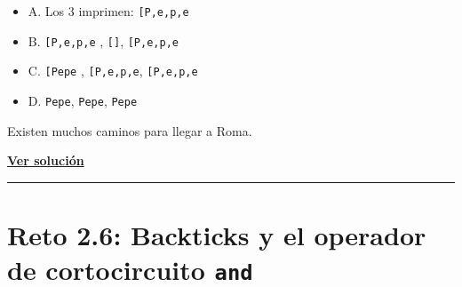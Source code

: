 \documentclass[
  letterpaper,
  DIV=11,
  numbers=noendperiod]{scrreprt}
\providecommand{\tightlist}{%
  \setlength{\itemsep}{0pt}\setlength{\parskip}{0pt}}
\begin{document}
\begin{itemize}
\tightlist
\item
  A. Los 3 imprimen:
  \texttt{{[}\textquotesingle{}P\textquotesingle{},\textquotesingle{}e\textquotesingle{},\textquotesingle{}p\textquotesingle{},\textquotesingle{}e\textquotesingle{}{]}}
\item
  B.
  \texttt{{[}\textquotesingle{}P\textquotesingle{},\textquotesingle{}e\textquotesingle{},\textquotesingle{}p\textquotesingle{},\textquotesingle{}e\textquotesingle{}{]}}
  , \texttt{{[}{]}},
  \texttt{{[}\textquotesingle{}P\textquotesingle{},\textquotesingle{}e\textquotesingle{},\textquotesingle{}p\textquotesingle{},\textquotesingle{}e\textquotesingle{}{]}}
\item
  C. \texttt{{[}\textquotesingle{}Pepe\textquotesingle{}{]}} ,
  \texttt{{[}\textquotesingle{}P\textquotesingle{},\textquotesingle{}e\textquotesingle{},\textquotesingle{}p\textquotesingle{},\textquotesingle{}e\textquotesingle{}{]}},
  \texttt{{[}\textquotesingle{}P\textquotesingle{},\textquotesingle{}e\textquotesingle{},\textquotesingle{}p\textquotesingle{},\textquotesingle{}e\textquotesingle{}{]}}
\item
  D. \texttt{Pepe}, \texttt{Pepe}, \texttt{Pepe}
\end{itemize}

\begin{tcolorbox}[enhanced jigsaw, left=2mm, toprule=.15mm, leftrule=.75mm, breakable, colback=white, coltitle=black, bottomtitle=1mm, arc=.35mm, rightrule=.15mm, colframe=quarto-callout-tip-color-frame, opacitybacktitle=0.6, toptitle=1mm, opacityback=0, titlerule=0mm, title=\textcolor{quarto-callout-tip-color}{\faLightbulb}\hspace{0.5em}{Pista}, bottomrule=.15mm, colbacktitle=quarto-callout-tip-color!10!white]

Existen muchos caminos para llegar a Roma.

\end{tcolorbox}

\textbf{\hyperref[sec-sol-cap2-reto5]{Ver solución}}

\begin{center}\rule{0.5\linewidth}{0.5pt}\end{center}

\section{\texorpdfstring{Reto 2.6: Backticks y el operador de
cortocircuito
\texttt{and}}{Reto 2.6: Backticks y el operador de cortocircuito and}}\label{sec-cap2-reto6}
\end{document}
